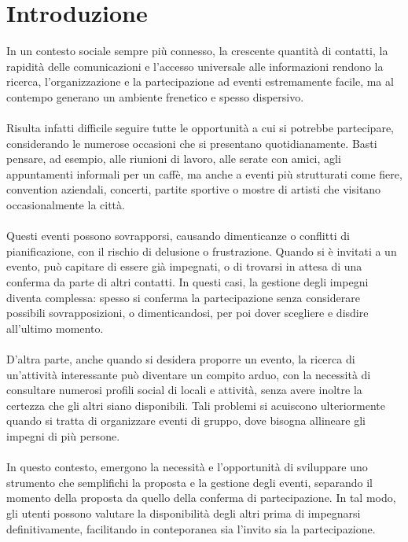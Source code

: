 \chapter*{Introduzione}


In un contesto sociale sempre più connesso, la crescente quantità di contatti, 
la rapidità delle comunicazioni e l'accesso universale alle informazioni 
rendono la ricerca, l'organizzazione e la partecipazione ad eventi estremamente facile, 
ma al contempo generano un ambiente frenetico e spesso dispersivo.\\
\\
Risulta infatti difficile seguire tutte le opportunità a cui si potrebbe partecipare, 
considerando le numerose occasioni che si presentano quotidianamente. 
Basti pensare, ad esempio, alle riunioni di lavoro, alle serate con amici, agli appuntamenti informali per un caffè, 
ma anche a eventi più strutturati come fiere, convention aziendali, concerti, partite sportive o mostre di artisti che visitano occasionalmente la città.\\
\\
Questi eventi possono sovrapporsi, causando dimenticanze o conflitti di pianificazione, 
con il rischio di delusione o frustrazione. 
Quando si è invitati a un evento, può capitare di essere già impegnati, 
o di trovarsi in attesa di una conferma da parte di altri contatti.
In questi casi, la gestione degli impegni diventa complessa: 
spesso si conferma la partecipazione senza considerare possibili sovrapposizioni, o dimenticandosi, 
per poi dover scegliere e disdire all'ultimo momento. \\
\\
D’altra parte, anche quando si desidera proporre un evento, 
la ricerca di un'attività interessante può diventare un compito arduo, 
con la necessità di consultare numerosi profili social di locali e attività,
senza avere inoltre la certezza che gli altri siano disponibili.
Tali problemi si acuiscono ulteriormente quando si tratta di organizzare eventi di gruppo, 
dove bisogna allineare gli impegni di più persone.\\
\\
In questo contesto, emergono la necessità e l'opportunità di sviluppare uno strumento che semplifichi la proposta e la gestione degli eventi, 
separando il momento della proposta da quello della conferma di partecipazione. 
In tal modo, gli utenti possono valutare la disponibilità degli altri prima di impegnarsi definitivamente, 
facilitando in conteporanea sia l'invito sia la partecipazione.\\ 
